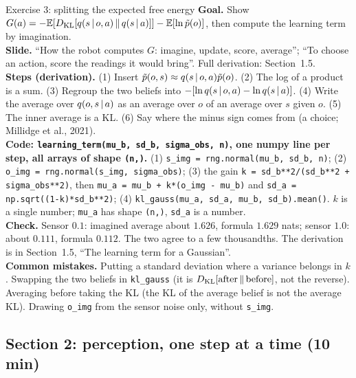 \documentclass[11pt]{article}
\begin{document}
\begin{labhelp}{Exercise 3: splitting the expected free energy}
\textbf{Goal.} Show $G(a) = -\mathbb{E}[D_{\mathrm{KL}}\!\left[q(s\,|\, o,a)\,\middle\|\,q(s\,|\, a)\right]] - \mathbb{E}[\ln\tilde p(o)]$, then compute the learning term by imagination.\\
\textbf{Slide.} ``How the robot computes $G$: imagine, update, score, average''; ``To choose an action, score the readings it would bring''. Full derivation: Section~1.5.\\
\textbf{Steps (derivation).} (1) Insert $\tilde p(o,s)\approx q(s\,|\, o,a)\tilde p(o)$. (2) The log of a product is a sum. (3) Regroup the two beliefs into $-[\ln q(s\,|\, o,a)-\ln q(s\,|\, a)]$. (4) Write the average over $q(o,s\,|\, a)$ as an average over $o$ of an average over $s$ given $o$. (5) The inner average is a KL. (6) Say where the minus sign comes from (a choice; Millidge et al., 2021).\\
\textbf{Code: \texttt{learning\_term(mu\_b, sd\_b, sigma\_obs, n)}, one numpy line per step, all arrays of shape \texttt{(n,)}.} (1) \texttt{s\_img = rng.normal(mu\_b, sd\_b, n)}; (2) \texttt{o\_img = rng.normal(s\_img, sigma\_obs)}; (3) the gain \texttt{k = sd\_b**2/(sd\_b**2 + sigma\_obs**2)}, then \texttt{mu\_a = mu\_b + k*(o\_img - mu\_b)} and \texttt{sd\_a = np.sqrt((1-k)*sd\_b**2)}; (4) \texttt{kl\_gauss(mu\_a, sd\_a, mu\_b, sd\_b).mean()}. $k$ is a single number; \texttt{mu\_a} has shape \texttt{(n,)}, \texttt{sd\_a} is a number.\\
\textbf{Check.} Sensor $0.1$: imagined average about $1.626$, formula $1.629$ nats; sensor $1.0$: about $0.111$, formula $0.112$. The two agree to a few thousandths. The derivation is in Section~1.5, ``The learning term for a Gaussian''.\\
\textbf{Common mistakes.} Putting a standard deviation where a variance belongs in $k$. Swapping the two beliefs in \texttt{kl\_gauss} (it is $D_{\mathrm{KL}}\!\left[\text{after}\,\middle\|\,\text{before}\right]$, not the reverse). Averaging before taking the KL (the KL of the average belief is not the average KL). Drawing \texttt{o\_img} from the sensor noise only, without \texttt{s\_img}.
\end{labhelp}

\subsection*{Section 2: perception, one step at a time (10 min)}
\end{document}
